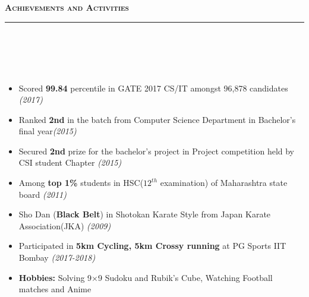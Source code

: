 \documentclass[a4paper,10pt]{article}
\newcommand{\isep}{-2 pt}
\newcommand{\lsep}{-0.5cm}
\newcommand{\resheading}[1]{{\small
        {
            \begin{minipage}
                {0.992\textwidth}\textbf{{\textsc{#1 \vphantom{p\^{E}} }}}
                \\[-0.3cm]
                \hrule
            \end{minipage}
            \\[-0.5cm]
        }
 }}
\begin{document}
\hspace{0.2cm}\\
\hspace{0.2cm}\\
\hspace{0.2cm}\\
\hspace{0.2cm}\\
\hspace{0.2cm}\\
\hspace{0.2cm}\\
\hspace{0.2cm}\\
\hspace{0.2cm}\\
\hspace{0.2cm}\\
\hspace{0.2cm}\\
\hspace{0.2cm}\\
\hspace{0.2cm}\\
\resheading{\textbf{\large Achievements and Activities}}\\[\lsep]
\\[-0.35cm]
\begin{itemize}\itemsep \isep
    \item Scored \textbf{99.84} percentile in GATE 2017 CS/IT amongst 96,878 candidates \emph{\hfill  (2017)}
    \item Ranked \textbf{2nd} in the batch from Computer Science Department in Bachelor's final year\emph{\hfill  (2015)}
    \item Secured \textbf{2nd} prize for the bachelor's project in Project competition held by CSI student Chapter
    \emph{\hfill  (2015)}
    \item Among \textbf{top 1\%} students in HSC($12^{th}$ examination) of Maharashtra  state board \emph{\hfill  (2011)}
    \item Sho Dan (\textbf{Black Belt}) in Shotokan Karate Style from Japan Karate Association(JKA) \emph{\hfill  (2009)}
    \item Participated in \textbf{5km Cycling, 5km Crossy running} at PG Sports IIT Bombay \emph{\hfill  (2017-2018)} 
    \item \textbf{Hobbies:} Solving 9$\times$9 Sudoku and Rubik's Cube, Watching Football matches and Anime\\[-0.5cm]
\end{itemize}
\end{document}
